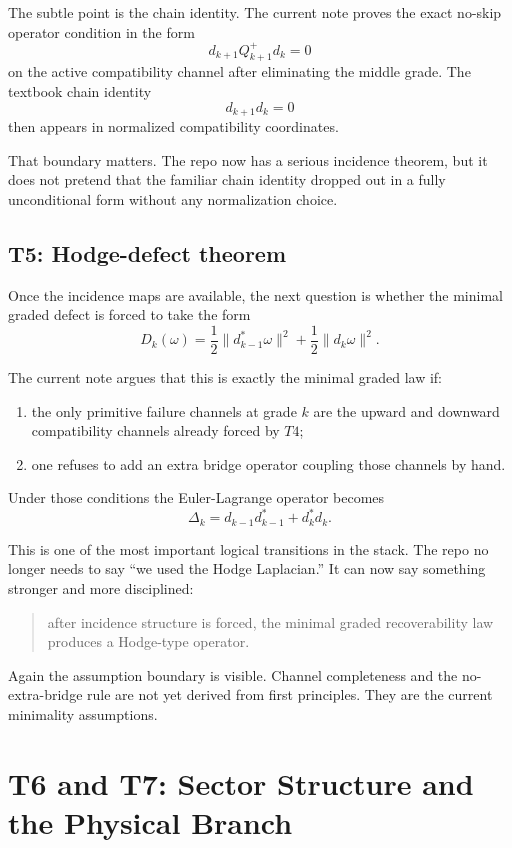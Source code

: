\documentclass[11pt]{article}
\begin{document}
The subtle point is the chain identity. The current note proves the exact no-skip operator condition in the form
\[
d_{k+1}Q_{k+1}^+d_k = 0
\]
on the active compatibility channel after eliminating the middle grade. The textbook chain identity
\[
d_{k+1}d_k = 0
\]
then appears in normalized compatibility coordinates.

That boundary matters. The repo now has a serious incidence theorem, but it does not pretend that the familiar chain identity dropped out in a fully unconditional form without any normalization choice.

\subsection{T5: Hodge-defect theorem}

Once the incidence maps are available, the next question is whether the minimal graded defect is forced to take the form
\[
D_k(\omega)
=
\frac{1}{2}\|d_{k-1}^*\omega\|^2
+
\frac{1}{2}\|d_k\omega\|^2.
\]

The current note argues that this is exactly the minimal graded law if:
\begin{enumerate}
\item the only primitive failure channels at grade $k$ are the upward and downward compatibility channels already forced by $T4$;
\item one refuses to add an extra bridge operator coupling those channels by hand.
\end{enumerate}

Under those conditions the Euler-Lagrange operator becomes
\[
\Delta_k = d_{k-1}d_{k-1}^* + d_k^*d_k.
\]

This is one of the most important logical transitions in the stack. The repo no longer needs to say ``we used the Hodge Laplacian.'' It can now say something stronger and more disciplined:
\begin{quote}
after incidence structure is forced, the minimal graded recoverability law produces a Hodge-type operator.
\end{quote}

Again the assumption boundary is visible. Channel completeness and the no-extra-bridge rule are not yet derived from first principles. They are the current minimality assumptions.

\section{T6 and T7: Sector Structure and the Physical Branch}
\end{document}
